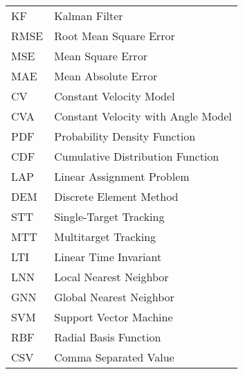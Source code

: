 	\begin{supertabular}{ll}
		KF		& Kalman Filter \\
		RMSE	& Root Mean Square Error \\
		MSE     & Mean Square Error \\
		MAE     & Mean Absolute Error \\
		CV      & Constant Velocity Model \\
		CVA     & Constant Velocity with Angle Model \\
		PDF     & Probability Density Function \\
		CDF     & Cumulative Distribution Function \\
		LAP     & Linear Assignment Problem \\
		DEM     & Discrete Element Method \\
		STT     & Single-Target Tracking \\
		MTT     & Multitarget Tracking \\
		LTI     & Linear Time Invariant \\
		LNN     & Local Nearest Neighbor \\
		GNN     & Global Nearest Neighbor \\
		SVM     & Support Vector Machine \\
		RBF     & Radial Basis Function \\
		CSV     & Comma Separated Value \\
	\end{supertabular}

